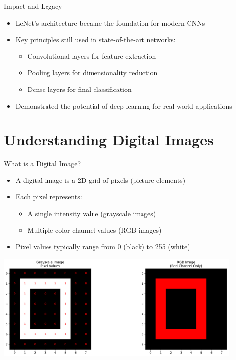 \documentclass{beamer}
\begin{document}
\begin{frame}{Impact and Legacy}
  \begin{itemize}
    \item LeNet's architecture became the foundation for modern CNNs
    \item Key principles still used in state-of-the-art networks:
      \begin{itemize}
        \item Convolutional layers for feature extraction
        \item Pooling layers for dimensionality reduction
        \item Dense layers for final classification
      \end{itemize}
    \item Demonstrated the potential of deep learning for real-world applications
  \end{itemize}
\end{frame}

\section{Understanding Digital Images}

\begin{frame}{What is a Digital Image?}
  \begin{itemize}
    \item A digital image is a 2D grid of pixels (picture elements)
    \item Each pixel represents:
      \begin{itemize}
        \item A single intensity value (grayscale images)
        \item Multiple color channel values (RGB images)
      \end{itemize}
    \item Pixel values typically range from 0 (black) to 255 (white)
  \end{itemize}
  \begin{center}
    \includegraphics[width=0.9\textwidth]{images/image_representation.png}
  \end{center}
\end{frame}
\end{document}
